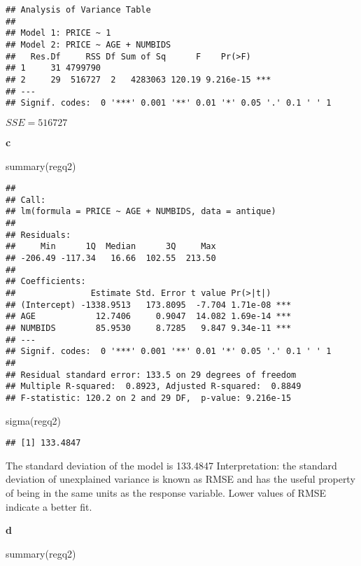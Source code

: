 \documentclass[
]{article}
\newenvironment{Shaded}{\begin{snugshade}}{\end{snugshade}}
\newcommand{\FunctionTok}[1]{\textcolor[rgb]{0.00,0.00,0.00}{#1}}
\newcommand{\NormalTok}[1]{#1}
\begin{document}
\begin{verbatim}
## Analysis of Variance Table
## 
## Model 1: PRICE ~ 1
## Model 2: PRICE ~ AGE + NUMBIDS
##   Res.Df     RSS Df Sum of Sq      F    Pr(>F)    
## 1     31 4799790                                  
## 2     29  516727  2   4283063 120.19 9.216e-15 ***
## ---
## Signif. codes:  0 '***' 0.001 '**' 0.01 '*' 0.05 '.' 0.1 ' ' 1
\end{verbatim}

\(SSE = 516727\)

\textbf{c}

\begin{Shaded}
\begin{Highlighting}[]
\FunctionTok{summary}\NormalTok{(regq2)}
\end{Highlighting}
\end{Shaded}

\begin{verbatim}
## 
## Call:
## lm(formula = PRICE ~ AGE + NUMBIDS, data = antique)
## 
## Residuals:
##     Min      1Q  Median      3Q     Max 
## -206.49 -117.34   16.66  102.55  213.50 
## 
## Coefficients:
##               Estimate Std. Error t value Pr(>|t|)    
## (Intercept) -1338.9513   173.8095  -7.704 1.71e-08 ***
## AGE            12.7406     0.9047  14.082 1.69e-14 ***
## NUMBIDS        85.9530     8.7285   9.847 9.34e-11 ***
## ---
## Signif. codes:  0 '***' 0.001 '**' 0.01 '*' 0.05 '.' 0.1 ' ' 1
## 
## Residual standard error: 133.5 on 29 degrees of freedom
## Multiple R-squared:  0.8923, Adjusted R-squared:  0.8849 
## F-statistic: 120.2 on 2 and 29 DF,  p-value: 9.216e-15
\end{verbatim}

\begin{Shaded}
\begin{Highlighting}[]
\FunctionTok{sigma}\NormalTok{(regq2)}
\end{Highlighting}
\end{Shaded}

\begin{verbatim}
## [1] 133.4847
\end{verbatim}

The standard deviation of the model is 133.4847 Interpretation: the
standard deviation of unexplained variance is known as RMSE and has the
useful property of being in the same units as the response variable.
Lower values of RMSE indicate a better fit.

\textbf{d}

\begin{Shaded}
\begin{Highlighting}[]
\FunctionTok{summary}\NormalTok{(regq2)}
\end{Highlighting}
\end{Shaded}
\end{document}
